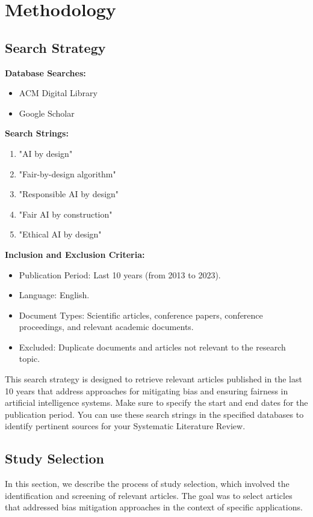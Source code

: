 \documentclass{article}
\begin{document}
\section{Methodology}
    \subsection{Search Strategy}
    \textbf{Database Searches:}
\begin{itemize}
    \item ACM Digital Library
    \item Google Scholar
\end{itemize}

\textbf{Search Strings:}
\begin{enumerate}
    \item "AI by design"
    \item "Fair-by-design algorithm"
    \item "Responsible AI by design"
    \item "Fair AI by construction"
    \item "Ethical AI by design"
\end{enumerate}

\textbf{Inclusion and Exclusion Criteria:}
\begin{itemize}
    \item Publication Period: Last 10 years (from 2013 to 2023).
    \item Language: English.
    \item Document Types: Scientific articles, conference papers, conference proceedings, and relevant academic documents.
    \item Excluded: Duplicate documents and articles not relevant to the research topic.
\end{itemize}

This search strategy is designed to retrieve relevant articles published in the last 10 years that address approaches for mitigating bias and ensuring fairness in artificial intelligence systems. Make sure to specify the start and end dates for the publication period. You can use these search strings in the specified databases to identify pertinent sources for your Systematic Literature Review.

    \subsection{Study Selection}
    In this section, we describe the process of study selection, which involved the identification and screening of relevant articles. The goal was to select articles that addressed bias mitigation approaches in the context of specific applications.
\end{document}
